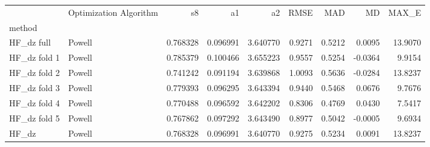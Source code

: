 \begin{tabular}{llrrrrrrr}
 & Optimization Algorithm & s8 & a1 & a2 & RMSE & MAD & MD & MAX_E \\
method &  &  &  &  &  &  &  &  \\
HF_dz full & Powell & 0.768328 & 0.096991 & 3.640770 & 0.9271 & 0.5212 & 0.0095 & 13.9070 \\
HF_dz fold 1 & Powell & 0.785379 & 0.100466 & 3.655223 & 0.9557 & 0.5254 & -0.0364 & 9.9154 \\
HF_dz fold 2 & Powell & 0.741242 & 0.091194 & 3.639868 & 1.0093 & 0.5636 & -0.0284 & 13.8237 \\
HF_dz fold 3 & Powell & 0.779393 & 0.096295 & 3.643394 & 0.9440 & 0.5468 & 0.0676 & 9.7676 \\
HF_dz fold 4 & Powell & 0.770488 & 0.096592 & 3.642202 & 0.8306 & 0.4769 & 0.0430 & 7.5417 \\
HF_dz fold 5 & Powell & 0.767862 & 0.097292 & 3.643490 & 0.8977 & 0.5042 & -0.0005 & 9.6934 \\
HF_dz & Powell & 0.768328 & 0.096991 & 3.640770 & 0.9275 & 0.5234 & 0.0091 & 13.8237 \\
\end{tabular}

